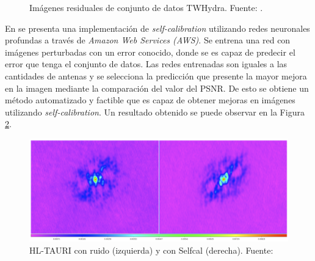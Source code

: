 \begin{figure}
 \centering
 \caption[Imagenes residuales CASA self-calibration]{Imágenes residuales de conjunto de datos TWHydra. Fuente: \citep{CASA_self_cal}.}
 \label{fig:selcal_comp}
\end{figure}

En \cite{FernandezTesis} se presenta una implementación de \textit{self-calibration} utilizando redes neuronales profundas a través de \textit{Amazon Web Services (AWS)}. Se entrena una red con imágenes perturbadas con un error conocido, donde se es capaz de predecir el error que tenga el conjunto de datos. Las redes entrenadas son iguales a las cantidades de antenas y se selecciona la predicción que presente la mayor mejora en la imagen mediante la comparación del valor del PSNR. De esto se obtiene un método automatizado y factible que es capaz de obtener mejoras en imágenes utilizando \textit{self-calibration}. Un resultado obtenido se puede observar en la Figura \ref{fig:tesis_fer}.

\begin{figure}[!ht]
	\centering
	\captionsetup{justification=centering}
	\includegraphics[scale=0.3]{images/self_cal_tesis.png}
	\caption[Resultado de Selfcal con redes neuronales]{HL-TAURI con ruido (izquierda) y con Selfcal (derecha). Fuente: \citep{FernandezTesis}}
	\label{fig:tesis_fer}
\end{figure}
